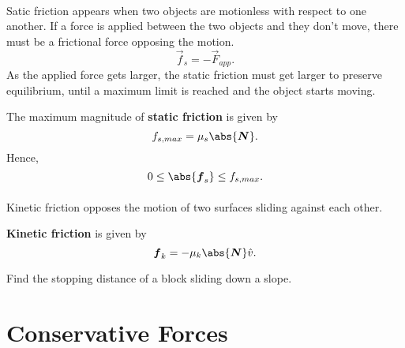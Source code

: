 \documentclass[../newtonian_mechanics.tex]{subfiles}
\begin{document}
        \paragraph{}
        Satic friction appears when two objects are motionless with respect to one another.
        If a force is applied between the two objects and they don't move, there must be a frictional force opposing the motion.
        \begin{equation}
            \vec{f}_s=-\vec{F}_{app}.
        \end{equation}
        As the applied force gets larger, the static friction must get larger to preserve equilibrium, until a maximum limit is reached and the object starts moving.
        \begin{definition}
            The maximum magnitude of \textbf{static friction} is given by
            \begin{equation}
                f_{s,max}=\mu_s\abs{\vec{N}}.
            \end{equation}
            Hence,
            \begin{equation}
                0\leq\abs{\vec{f}_s}\leq f_{s,max}.
            \end{equation}
        \end{definition}

        \paragraph{}
        Kinetic friction opposes the motion of two surfaces sliding against each other.
        \begin{definition}
            \textbf{Kinetic friction} is given by
            \begin{equation}
                \vec{f}_k=-\mu_k\abs{\vec{N}}\hat{v}.
            \end{equation}
        \end{definition}
        \begin{example}
            Find the stopping distance of a block sliding down a slope.
        \end{example}

    \section{Conservative Forces}
\end{document}

